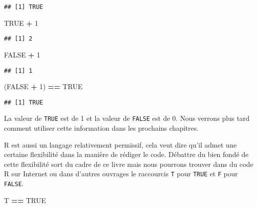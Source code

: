 \documentclass[]{book}
\newenvironment{Shaded}{\begin{snugshade}}{\end{snugshade}}
\newcommand{\DecValTok}[1]{\textcolor[rgb]{0.00,0.00,0.81}{#1}}
\newcommand{\StringTok}[1]{\textcolor[rgb]{0.31,0.60,0.02}{#1}}
\newcommand{\OtherTok}[1]{\textcolor[rgb]{0.56,0.35,0.01}{#1}}
\newcommand{\OperatorTok}[1]{\textcolor[rgb]{0.81,0.36,0.00}{\textbf{#1}}}
\newcommand{\NormalTok}[1]{#1}
\theoremstyle{definition}
\theoremstyle{definition}
\theoremstyle{definition}
\theoremstyle{remark}
\begin{document}
\begin{verbatim}
## [1] TRUE
\end{verbatim}

\begin{Shaded}
\begin{Highlighting}[]
\OtherTok{TRUE} \OperatorTok{+}\StringTok{ }\DecValTok{1}
\end{Highlighting}
\end{Shaded}

\begin{verbatim}
## [1] 2
\end{verbatim}

\begin{Shaded}
\begin{Highlighting}[]
\OtherTok{FALSE} \OperatorTok{+}\StringTok{ }\DecValTok{1}
\end{Highlighting}
\end{Shaded}

\begin{verbatim}
## [1] 1
\end{verbatim}

\begin{Shaded}
\begin{Highlighting}[]
\NormalTok{(}\OtherTok{FALSE} \OperatorTok{+}\StringTok{ }\DecValTok{1}\NormalTok{) }\OperatorTok{==}\StringTok{ }\OtherTok{TRUE}
\end{Highlighting}
\end{Shaded}

\begin{verbatim}
## [1] TRUE
\end{verbatim}

La valeur de \texttt{TRUE} est de 1 et la valeur de \texttt{FALSE} est
de 0. Nous verrons plus tard comment utiliser cette information dans les
prochains chapitres.

R est aussi un langage relativement permissif, cela veut dire qu'il
admet une certaine flexibilité dans la manière de rédiger le code.
Débattre du bien fondé de cette flexibilité sort du cadre de ce livre
mais nous pourrons trouver dans du code R sur Internet ou dans d'autres
ouvrages le raccourcis \texttt{T} pour \texttt{TRUE} et \texttt{F} pour
\texttt{FALSE}.

\begin{Shaded}
\begin{Highlighting}[]
\NormalTok{T }\OperatorTok{==}\StringTok{ }\OtherTok{TRUE}
\end{Highlighting}
\end{Shaded}
\end{document}
